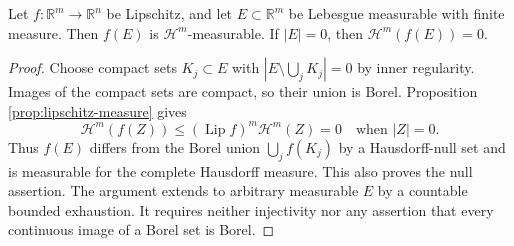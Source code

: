 \begin{lemma}\label{lem:finite-volume-lipschitz-image-measurable}
Let $f:\mathbb R^m\to\mathbb R^n$ be Lipschitz, and let $E\subset\mathbb R^m$ be Lebesgue measurable with finite measure. Then $f(E)$ is $\mathcal H^m$-measurable. If $|E|=0$, then $\mathcal H^m(f(E))=0$.
\end{lemma}
\begin{proof}
Choose compact sets $K_j\subset E$ with $|E\setminus\bigcup_jK_j|=0$ by inner regularity. Images of the compact sets are compact, so their union is Borel. Proposition \ref{prop:lipschitz-measure} gives
\[
 \mathcal H^m(f(Z))\leq (\operatorname{Lip}f)^m\mathcal H^m(Z)=0
 \quad\text{when }|Z|=0.
\]
Thus $f(E)$ differs from the Borel union $\bigcup_jf(K_j)$ by a Hausdorff-null set and is measurable for the complete Hausdorff measure. This also proves the null assertion. The argument extends to arbitrary measurable $E$ by a countable bounded exhaustion. It requires neither injectivity nor any assertion that every continuous image of a Borel set is Borel.
\end{proof}

